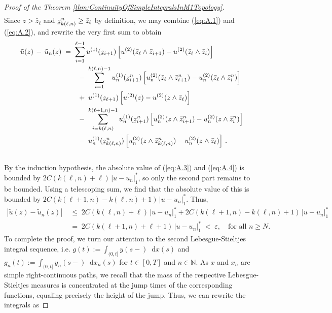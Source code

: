 \documentclass[11pt]{article}
\theoremstyle{definition}\newtheorem{example}[theorem]{Example}
\theoremstyle{definition}\newtheorem{counterexample}[theorem]{Counterexample}
\theoremstyle{definition}\newtheorem{remark}[theorem]{Remark}
\theoremstyle{definition}\newtheorem{defi}[theorem]{Definition}
\numberwithin{equation}{section}
\newcommand{\ubar}[1]{\underaccent{\bar}{#1}}
\newcommand{\N}{\mathbb{N}}
\newcommand*\diff{\mathop{}\!\mathrm{d}}								%
\renewcommand{\|}{\; : \, \;}											%
\begin{document}
\begin{proof}[Proof of the Theorem \ref{thm:ContinuityOfSimpleIntegralsInM1Topology}]
\begin{align}
	\end{align}
	Since $z > \bar{z}_\ell$ and $\ubar{z}^n_{k(\ell,n)}\ge \bar{z}_\ell$ by definition, we may combine (\ref{eq:A.1}) and (\ref{eq:A.2}), and rewrite the very first sum to obtain
	\begin{align}
		\tilde{u}(z) \, - \, \tilde{u}_n(z) \; &= \;  \sum_{i=1}^{\ell-1} u^{(1)}(\ubar{z}_{i+1}) \left[u^{(2)}(\bar{z}_\ell \wedge \bar{z}_{i+1}) - u^{(2)}(\bar{z}_\ell \wedge \bar{z}_{i})\right] \label{eq:A.3}\\
		& \qquad - \; \sum_{i=1}^{k(\ell,n) -1} u_n^{(1)}(\ubar{z}^n_{i+1})  \left[u_n^{(2)}(\bar{z}_\ell \wedge \bar{z}^n_{i+1}) - u_n^{(2)}(\bar{z}_\ell \wedge \bar{z}^n_{i})\right] \label{eq:A.4}\\
		&\qquad + \; u^{(1)}(\ubar{z}_{\ell+1})  \left[u^{(2)}(z) - u^{(2)}(z \wedge \bar{z}_{\ell})\right] \notag\\
		&\qquad - \; \sum_{i=k(\ell,n)}^{k(\ell+1,n) -1} u_n^{(1)}(\ubar{z}^n_{i+1}) \left[u_n^{(2)}(z \wedge \bar{z}^n_{i+1}) - u_n^{(2)}(z \wedge \bar{z}^n_{i})\right] \notag\\
		&\qquad - \;  u_n^{(1)}(\ubar{z}^n_{k(\ell,n)}) \left[u_n^{(2)}(z \wedge \bar{z}^n_{k(\ell,n)}) - u_n^{(2)}(z \wedge \bar{z}_{\ell})\right] \, . \notag
	\end{align}
	\ \\[-1ex]
	By the induction hypothesis, the absolute value of (\ref{eq:A.3}) and (\ref{eq:A.4}) is bounded by $2 C(k(\ell,n)+\ell)\, |u - u_n|_1^*$, so only the second part remains to be bounded. Using a telescoping sum, we find that the absolute value of this is bounded by $2 C (k(\ell+1,n) - k(\ell,n) + 1) \, |u - u_n|_1^*$. Thus,
	\begin{align*}
		|\tilde{u}(z) - \tilde{u}_n(z)| \; &\leq \; 2 C(k(\ell,n)+\ell) \, |u - u_n|_1^* + 2 C(k(\ell+1,n) - k(\ell,n) +1 ) \, |u - u_n|^*_1\\
		&= \; 2 C(k(\ell+1,n)+ \ell+1) \,  |u - u_n|_1^* \; < \; \varepsilon,\quad \text{for all } n\geq N.
	\end{align*}
	To complete the proof, we turn our attention to the second Lebesgue-Stieltjes integral sequence, i.e. $g(t) := \int_{(0,t]} y(s-) \diff x(s)$ and  $g_n(t) := \int_{(0,t]} y_n(s-) \diff x_n(s)$ for $t\in [0,T]$ and $n\in \N$. As $x$ and $x_n$ are simple right-continuous paths, we recall that the mass of the respective Lebesgue-Stieltjes measures is concentrated at the jump times of the corresponding functions, equaling precisely the height of the jump. Thus, we can rewrite the integrals as

\end{proof}
\end{document}
